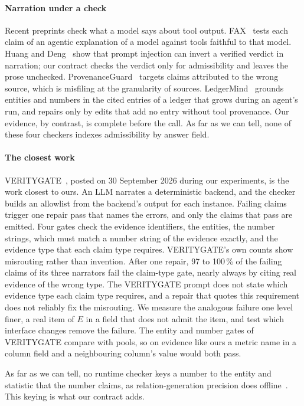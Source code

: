 \documentclass[journal]{IEEEtran}
\begin{document}
\paragraph{Narration under a check}
Recent preprints check what a model says about tool output.
FAX~\cite{kim2026fax} tests each claim of an agentic explanation of a model
against tools faithful to that model. Huang and Deng~\cite{huang2026narration}
show that prompt injection can invert a verified verdict in narration; our
contract checks the verdict only for admissibility and leaves the prose
unchecked. ProvenanceGuard~\cite{alvarez2026provenanceguard} targets claims
attributed to the wrong source, which is misfiling at the granularity of sources.
LedgerMind~\cite{du2026ledgermind} grounds entities and numbers in the cited
entries of a ledger that grows during an agent's run, and repairs only by edits
that add no entry without tool provenance. Our evidence, by contrast, is complete
before the call. As far as we can tell, none of these four checkers indexes
admissibility by answer field.

\paragraph{The closest work}
VERITYGATE~\cite{gupta2026veritygate}, posted on 30 September 2026 during our
experiments, is the work closest to ours. An LLM narrates a deterministic
backend, and the checker builds an allowlist from the backend's output for each
instance. Failing claims trigger one repair pass that names the errors, and only
the claims that pass are emitted. Four gates check the evidence identifiers, the
entities, the number strings, which must match a number string of the evidence
exactly, and the evidence type that each claim type requires. VERITYGATE's own
counts show misrouting rather than invention. After one repair, 97 to 100\,\% of
the failing claims of its three narrators fail the claim-type gate, nearly always
by citing real evidence of the wrong type. The VERITYGATE prompt does not state
which evidence type each claim type requires, and a repair that quotes this
requirement does not reliably fix the misrouting. We measure the analogous
failure one level finer, a real item of $E$ in a field that does not admit the
item, and test which interface changes remove the failure. The entity and number
gates of VERITYGATE compare with pools, so on evidence like ours a metric name in
a column field and a neighbouring column's value would both pass.

As far as we can tell, no runtime checker keys a number to the entity and
statistic that the number claims, as relation-generation precision does
offline~\cite{wiseman2017challenges}. This keying is what our contract adds.
\end{document}

